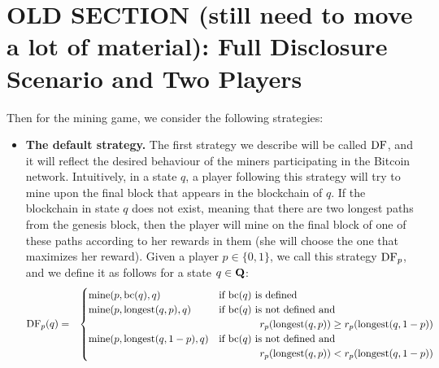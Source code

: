 
\section{OLD SECTION (still need to move a lot of material): Full Disclosure Scenario and Two Players}
\label{sec-fd&2p}


Then for the mining game, we consider the following strategies:
\begin{itemize}
\item {\bf The default strategy.}  The first strategy we describe will be called $\text{\rm DF}$, and it will reflect the desired behaviour of the miners participating in the Bitcoin network. Intuitively, in a state $q$, a player following this strategy will try to mine upon the final block that appears in the blockchain of $q$. If the blockchain in state $q$ does not exist, meaning that there are two longest paths from the genesis block, then the player will mine on the final block of one of these paths according to her rewards in them (she will choose the one that maximizes her reward). Given a player $p \in \{0,1\}$, we call this strategy $\text{\rm DF}_p$, and we define it as follows for a state $q \in \mathbf{Q}$:
\begin{eqnarray*}
\text{\rm DF}_p(q) & = &
\begin{cases}
\text{\rm mine}(p,\text{bc}(q),q) & \text{if } \text{bc}(q) \text{ is defined}\\
\text{\rm mine}(p,{\text{\rm longest}}(q,p),q) & \text{if } \text{bc}(q) \text{ is not defined and} \\
& \hspace{40pt} r_p({\text{\rm longest}}(q,p)) \geq r_p({\text{\rm longest}}(q,1-p))\\
\text{\rm mine}(p,{\text{\rm longest}}(q,1-p),q) & \text{if } \text{bc}(q) \text{ is not defined and}\\
& \hspace{40pt} r_p({\text{\rm longest}}(q,p)) < r_p({\text{\rm longest}}(q,1-p))
\end{cases}
\end{eqnarray*}


\end{itemize}
